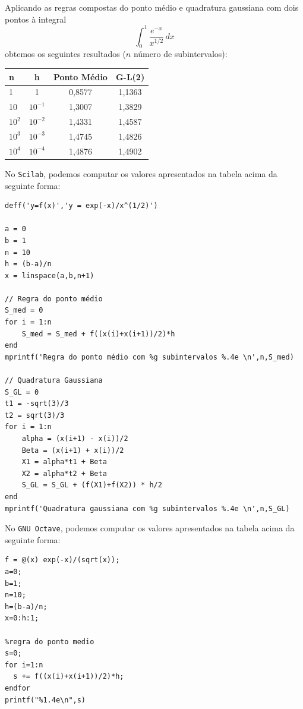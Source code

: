\begin{ex}\label{ex:int_impropria1}
  Aplicando as regras compostas do ponto médio e quadratura gaussiana com dois pontos à integral
  \begin{equation}
    \int_0^1 \frac{e^{-x}}{x^{1/2}}\,dx
  \end{equation}
obtemos os seguintes resultados ($n$ número de subintervalos):
\begin{center}
  \begin{tabular}{lc|c|c}\hline
    n      & h        & Ponto Médio & G-L(2)\\\hline
    1      & 1        & 0,8577 & 1,1363\\
    10     & $10^{-1}$ & 1,3007 & 1,3829\\
    $10^2$ & $10^{-2}$ & 1,4331 & 1,4587\\
    $10^3$ & $10^{-3}$ & 1,4745 & 1,4826\\
    $10^4$ & $10^{-4}$ & 1,4876 & 1,4902\\\hline
  \end{tabular}
\end{center}

\ifisscilab
No \verb+Scilab+, podemos computar os valores apresentados na tabela acima da seguinte forma:
\begin{verbatim}
deff('y=f(x)','y = exp(-x)/x^(1/2)')

a = 0
b = 1
n = 10
h = (b-a)/n
x = linspace(a,b,n+1) 
  
// Regra do ponto médio
S_med = 0
for i = 1:n
    S_med = S_med + f((x(i)+x(i+1))/2)*h
end
mprintf('Regra do ponto médio com %g subintervalos %.4e \n',n,S_med)
  
// Quadratura Gaussiana
S_GL = 0
t1 = -sqrt(3)/3
t2 = sqrt(3)/3
for i = 1:n
    alpha = (x(i+1) - x(i))/2
    Beta = (x(i+1) + x(i))/2
    X1 = alpha*t1 + Beta
    X2 = alpha*t2 + Beta
    S_GL = S_GL + (f(X1)+f(X2)) * h/2
end
mprintf('Quadratura gaussiana com %g subintervalos %.4e \n',n,S_GL)
\end{verbatim}
\fi
\ifisoctave
No \verb+GNU Octave+, podemos computar os valores apresentados na tabela acima da seguinte forma:
\begin{verbatim}
f = @(x) exp(-x)/(sqrt(x));
a=0;
b=1;
n=10;
h=(b-a)/n;
x=0:h:1;

%regra do ponto medio
s=0;
for i=1:n
  s += f((x(i)+x(i+1))/2)*h;
endfor
printf("%1.4e\n",s)


\end{verbatim}
\end{ex}
